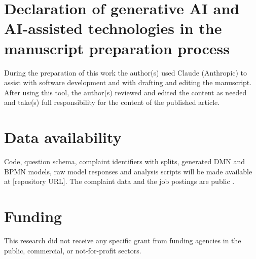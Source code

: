 \documentclass[a4paper,fleqn]{cas-sc}
\theoremstyle{definition}
\begin{document}
\section*{Declaration of generative AI and AI-assisted technologies in the manuscript preparation process}
During the preparation of this work the author(s) used Claude (Anthropic) to assist with software development and with drafting and editing the manuscript. After using this tool, the author(s) reviewed and edited the content as needed and take(s) full responsibility for the content of the published article.

\section*{Data availability}\label{sec:data-availability}
Code, question schema, complaint identifiers with splits, generated DMN and BPMN models, raw model responses and analysis scripts will be made available at [repository URL]. The complaint data and the job postings are public \citep{cfpb2026,heineman2025,vidros2017}.

\section*{Funding}
This research did not receive any specific grant from funding agencies in the public, commercial, or not-for-profit sectors.



\end{document}
